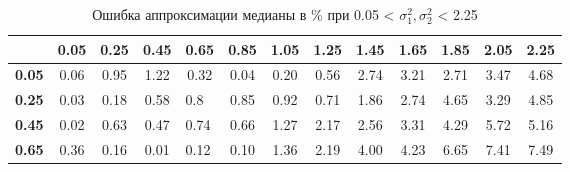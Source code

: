 \documentclass[12pt]{article}
\begin{document}
\begin{table}[!hhh]
	\caption{Ошибка аппроксимации медианы в \% при 0.05 < $\sigma_{1}^{2}, \sigma_{2}^{2}$ < 2.25 }
	\label{tab1}
	
	\begin{tabular}{|c|ccclcccccccc}
		\hline
		\textbf{}                         & \multicolumn{1}{c|}{\textbf{0.05}} & \multicolumn{1}{c|}{\textbf{0.25}} & \multicolumn{1}{c|}{\textbf{0.45}} & \multicolumn{1}{l|}{\textbf{0.65}} & \multicolumn{1}{c|}{\textbf{0.85}} & \multicolumn{1}{c|}{\textbf{1.05}} & \multicolumn{1}{c|}{\textbf{1.25}} & \multicolumn{1}{c|}{\textbf{1.45}} & \multicolumn{1}{c|}{\textbf{1.65}} & \multicolumn{1}{c|}{\textbf{1.85}} & \multicolumn{1}{c|}{\textbf{2.05}} & \multicolumn{1}{c|}{\textbf{2.25}} \\ \hline
		\textbf{0.05}                       & 0.06                               & 0.95                               & 1.22                               & \multicolumn{1}{c}{0.32}           & 0.04                               & 0.20                               & 0.56                               & 2.74                               & 3.21                               & 2.71                               & 3.47                               & 4.68                               \\ \cline{1-1}
		\textbf{0.25}                       & 0.03                               & 0.18                               & 0.58                               & 0.8                                & 0.85                               & 0.92                               & 0.71                               & 1.86                               & 2.74                               & 4.65                               & 3.29                               & 4.85                               \\ \cline{1-1}
		\textbf{0.45}                       & 0.02                               & 0.63                               & 0.47                               & 0.74                               & 0.66                               & 1.27                               & 2.17                               & 2.56                               & 3.31                               & 4.29                               & 5.72                               & 5.16                               \\ \cline{1-1}
		\textbf{0.65}                       & 0.36                               & 0.16                               & 0.01                               & 0.12                               & 0.10                               & 1.36                               & 2.19                               & 4.00                               & 4.23                               & 6.65                               & 7.41                               & 7.49                               \\ \cline{1-1}

\end{tabular}
\end{table}
\end{document}

